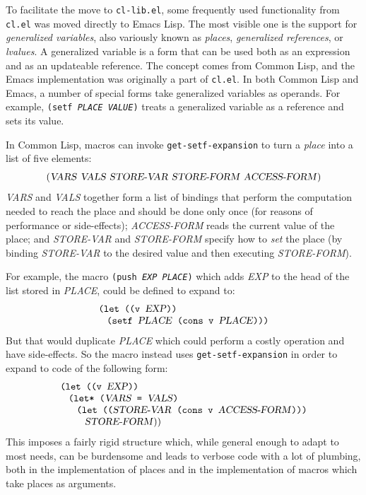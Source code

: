\documentclass[format=acmsmall,screen]{acmart}
\makeatletter
\newcommand \Elisp {Emacs Lisp}
\newcommand \MAlign [1] {\begin{array}{@{}l@{}}#1\end{array}}
\newcommand \id[1] {\textrm{\textsl{#1}}}
\makeatother
\begin{document}
To facilitate the move to \texttt{cl-lib.el}, some frequently used
functionality from \texttt{cl.el} was moved directly to \Elisp{}.  The most
visible one is the support for \emph{generalized variables}, also variously
known as \emph{places}, \emph{generalized references}, or \emph{lvalues}.
A generalized variable is a form that can be used both as an expression and
as an updateable reference.  The concept comes from Common Lisp, and the
Emacs implementation was originally a part of \texttt{cl.el}.  In both Common
Lisp and Emacs, a number of special forms take generalized variables as
operands.  For example, \texttt{(setf \id{PLACE} \id{VALUE})} treats
a generalized variable as a reference and sets its value.

In Common Lisp, macros can invoke \texttt{get-setf-expansion}
to turn a \emph{place} into a list of five elements:
\begin{displaymath}
  (\id{VARS}~\id{VALS}~\id{STORE-VAR}~\id{STORE-FORM}
  ~\id{ACCESS-FORM})
\end{displaymath}
\id{VARS} and \id{VALS} together form a list of bindings that perform
the computation needed to reach the place and should be done only once
(for reasons of performance or side-effects); \id{ACCESS-FORM} 
reads the current value of the place; and \id{STORE-VAR} and \id{STORE-FORM}
specify how to \emph{set} the place (by binding \id{STORE-VAR} to the
desired value and then executing \id{STORE-FORM}).

For example, the macro \texttt{(push \id{EXP} \id{PLACE})} which adds
\id{EXP} to the head of the list stored in \id{PLACE}, could be defined to
expand to:
%
\begin{displaymath}
  \MAlign{
    \texttt{(let ((v \id{EXP}))} \\
    \;\;\;\texttt{(setf \id{PLACE} (cons v \id{PLACE})))}}
\end{displaymath}
%
But that would duplicate \id{PLACE} which could perform a costly operation
and have side-effects.  So the macro instead uses
\texttt{get-setf-expansion} in order to expand to code of the following
form:
\begin{displaymath}
  \MAlign{
    \texttt{(let ((v \id{EXP}))} \\
    \;\;\;\MAlign{
      \texttt{(let* (\id{VARS} = \id{VALS})} \\
      \;\;\;\MAlign{
        \texttt{(let ((\id{STORE-VAR} (cons v \id{ACCESS-FORM})))} \\
        \;\;\;\id{STORE-FORM}))}}}
\end{displaymath}
This imposes a fairly rigid structure which, while general enough to adapt
to most needs, can be burdensome and leads to verbose code with a lot
of plumbing, both in the implementation of places and in the implementation
of macros which take places as arguments.
\end{document}
